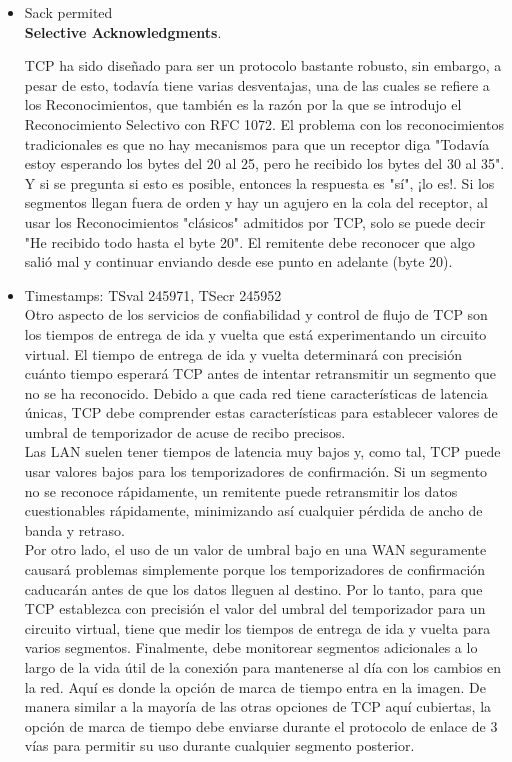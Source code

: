 \documentclass[osajnl,twocolumn,showpacs,superscriptaddress,10pt]{revtex4-1} %
\begin{document}
\begin{itemize}
    \item Sack permited \\

    \textbf{Selective Acknowledgments}.
    
    TCP ha sido diseñado para ser un protocolo bastante robusto, sin embargo, a pesar de esto, todavía tiene varias 
    desventajas, una de las cuales se refiere a los Reconocimientos, que también es la razón por la que se introdujo 
    el Reconocimiento Selectivo con RFC 1072. El problema con los reconocimientos tradicionales es que no hay 
    mecanismos para que un receptor diga "Todavía estoy esperando los bytes del 20 al 25, pero he recibido los bytes del 30 al 35". 
    Y si se pregunta si esto es posible, entonces la respuesta es "sí", ¡lo es!. Si los segmentos llegan fuera de orden y 
    hay un agujero en la cola del receptor, al usar los Reconocimientos "clásicos" admitidos por TCP, solo se puede decir 
    "He recibido todo hasta el byte 20". El remitente debe reconocer que algo salió mal y continuar enviando desde ese 
    punto en adelante (byte 20). \\

    \item Timestamps: TSval 245971, TSecr 245952 \\

    Otro aspecto de los servicios de confiabilidad y control de flujo de TCP son los tiempos de entrega de ida y vuelta que 
    está experimentando un circuito virtual. El tiempo de entrega de ida y vuelta determinará con precisión cuánto tiempo 
    esperará TCP antes de intentar retransmitir un segmento que no se ha reconocido. Debido a que cada red tiene características 
    de latencia únicas, TCP debe comprender estas características para establecer valores de umbral de temporizador de acuse de recibo precisos. \\ 
    
    Las LAN suelen tener tiempos de latencia muy bajos y, como tal, TCP puede usar valores bajos para los temporizadores de confirmación. 
    Si un segmento no se reconoce rápidamente, un remitente puede retransmitir los datos cuestionables rápidamente, minimizando 
    así cualquier pérdida de ancho de banda y retraso. \\
    
    Por otro lado, el uso de un valor de umbral bajo en una WAN seguramente causará problemas simplemente porque los temporizadores 
    de confirmación caducarán antes de que los datos lleguen al destino. Por lo tanto, para que TCP establezca con precisión el valor 
    del umbral del temporizador para un circuito virtual, tiene que medir los tiempos de entrega de ida y vuelta para varios segmentos. 
    Finalmente, debe monitorear segmentos adicionales a lo largo de la vida útil de la conexión para mantenerse al día con los cambios 
    en la red. Aquí es donde la opción de marca de tiempo entra en la imagen. De manera similar a la mayoría de las otras opciones de 
    TCP aquí cubiertas, la opción de marca de tiempo debe enviarse durante el protocolo de enlace de 3 vías para permitir su uso durante 
    cualquier segmento posterior.  \\


\end{itemize}
\end{document}
